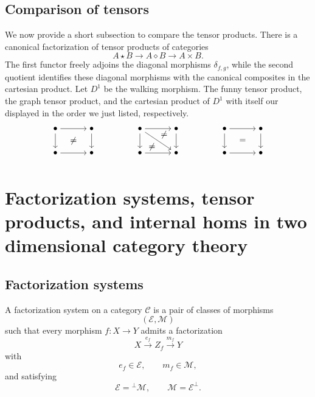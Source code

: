 \documentclass{tac}
\begin{document}
\subsection*{Comparison of tensors}
We now provide a short subsection to compare the tensor products. There is a canonical factorization of tensor products of categories
\[
A\star B
\longrightarrow
A\diamond B
\longrightarrow
A\times B.
\]
The first functor freely adjoins the diagonal morphisms
$\delta_{f,g}$, while the second quotient identifies these diagonal
morphisms with the canonical composites in the cartesian product. Let $D^1$ be the walking morphism. The funny tensor product, the graph tensor product, and the cartesian product of $D^1$ with itself our displayed in the order we just listed, respectively.
\[
\begin{tikzpicture}

\node (a1) at (0,1) {$\bullet$};
\node (b1) at (1.5,1) {$\bullet$};
\node (c1) at (0,0) {$\bullet$};
\node (d1) at (1.5,0) {$\bullet$};

\draw[->] (a1)--(b1);
\draw[->] (a1)--(c1);
\draw[->] (b1)--(d1);
\draw[->] (c1)--(d1);

\node at (0.75,0.5) {$\neq$};


\node (a2) at (3.5,1) {$\bullet$};
\node (b2) at (5,1) {$\bullet$};
\node (c2) at (3.5,0) {$\bullet$};
\node (d2) at (5,0) {$\bullet$};

\draw[->] (a2)--(b2);
\draw[->] (a2)--(c2);
\draw[->] (b2)--(d2);
\draw[->] (c2)--(d2);

\draw[->] (a2)--(d2);

\node at (4.5,0.75) {$\neq$};

\node at (4,0.25) {$\neq$};


\node (a3) at (7,1) {$\bullet$};
\node (b3) at (8.5,1) {$\bullet$};
\node (c3) at (7,0) {$\bullet$};
\node (d3) at (8.5,0) {$\bullet$};

\draw[->] (a3)--(b3);
\draw[->] (a3)--(c3);
\draw[->] (b3)--(d3);
\draw[->] (c3)--(d3);

\node at (7.75,0.5) {$=$};

\end{tikzpicture}
\]


\section{Factorization systems, tensor products, and internal homs in two dimensional category theory}
\subsection*{Factorization systems}
 A factorization system on a category $\mathcal{C}$
is a pair of classes of morphisms
\[
(\mathcal{E},\mathcal{M})
\]
such that every morphism $f:X\to Y$ admits a factorization
\[
X\xrightarrow{e_f}Z_f\xrightarrow{m_f}Y
\]
with
\[
e_f\in\mathcal{E},\qquad m_f\in\mathcal{M},
\]
and satisfying
\[
\mathcal{E}={}^{\perp}\mathcal{M},
\qquad
\mathcal{M}=\mathcal{E}^{\perp}.
\]
\end{document}
